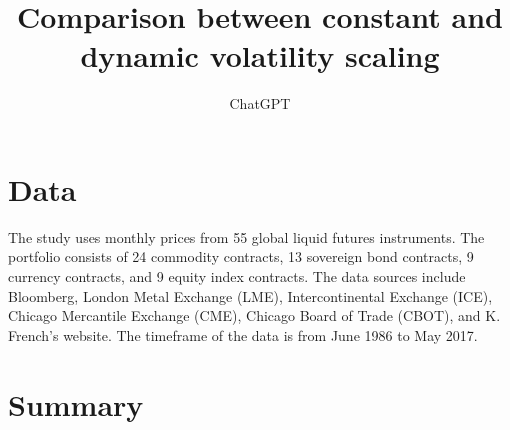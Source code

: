 \documentclass{article}
\title{Comparison between constant and dynamic volatility scaling}
\author{ChatGPT}
\begin{document}
 

\maketitle
\section{Data}
The study uses monthly prices from 55 global liquid futures instruments. The portfolio consists of 24 commodity contracts, 13 sovereign bond contracts, 9 currency contracts, and 9 equity index contracts. The data sources include Bloomberg, London Metal Exchange (LME), Intercontinental Exchange (ICE), Chicago Mercantile Exchange (CME), Chicago Board of Trade (CBOT), and K. French's website. The timeframe of the data is from June 1986 to May 2017. 
\section{Summary}
\end{document}
